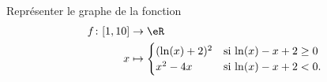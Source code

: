\begin{exercice}\label{exoSC_serie5-0005}

	Représenter le graphe de la fonction
	\begin{equation}
		\begin{aligned}
			f\colon \mathopen[ 1 , 10 \mathclose]&\to \eR \\
			x&\mapsto \begin{cases}
				(\ln(x)+2)^2	&	\text{si $\ln(x)-x+2\geq 0$}\\
				x^2-4x	&	 \text{si $\ln(x)-x+2<0$}.
			\end{cases}
		\end{aligned}
	\end{equation}
	

\end{exercice}
